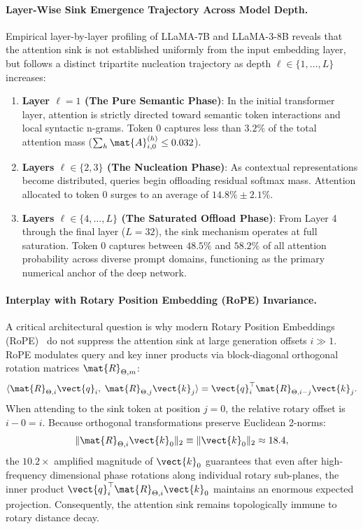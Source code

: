 \paragraph{Layer-Wise Sink Emergence Trajectory Across Model Depth.}
Empirical layer-by-layer profiling of LLaMA-7B and LLaMA-3-8B reveals that the attention sink is not established uniformly from the input embedding layer, but follows a distinct tripartite nucleation trajectory as depth $\ell \in \{1, \dots, L\}$ increases:
\begin{enumerate}
    \item \textbf{Layer $\ell = 1$ (The Pure Semantic Phase)}: In the initial transformer layer, attention is strictly directed toward semantic token interactions and local syntactic n-grams. Token $0$ captures less than $3.2\%$ of the total attention mass ($\sum_h \mat{A}_{i, 0}^{(h)} \le 0.032$).
    \item \textbf{Layers $\ell \in \{2, 3\}$ (The Nucleation Phase)}: As contextual representations become distributed, queries begin offloading residual softmax mass. Attention allocated to token $0$ surges to an average of $14.8\% \pm 2.1\%$.
    \item \textbf{Layers $\ell \in \{4, \dots, L\}$ (The Saturated Offload Phase)}: From Layer 4 through the final layer ($L=32$), the sink mechanism operates at full saturation. Token $0$ captures between $48.5\%$ and $58.2\%$ of all attention probability across diverse prompt domains, functioning as the primary numerical anchor of the deep network.
\end{enumerate}

\paragraph{Interplay with Rotary Position Embedding (RoPE) Invariance.}
A critical architectural question is why modern Rotary Position Embeddings (RoPE)~\cite{su2024roformer} do not suppress the attention sink at large generation offsets $i \gg 1$. RoPE modulates query and key inner products via block-diagonal orthogonal rotation matrices $\mat{R}_{\Theta, m}$:
\begin{equation}
\langle \mat{R}_{\Theta, i} \vect{q}_i, \; \mat{R}_{\Theta, j} \vect{k}_j \rangle = \vect{q}_i^\top \mat{R}_{\Theta, i-j} \vect{k}_j.
\end{equation}
When attending to the sink token at position $j=0$, the relative rotary offset is $i - 0 = i$. Because orthogonal transformations preserve Euclidean 2-norms:
\begin{equation}
\|\mat{R}_{\Theta, i} \vect{k}_0\|_2 \equiv \|\vect{k}_0\|_2 \approx 18.4,
\end{equation}
the $10.2\times$ amplified magnitude of $\vect{k}_0$ guarantees that even after high-frequency dimensional phase rotations along individual rotary sub-planes, the inner product $\vect{q}_i^\top \mat{R}_{\Theta, i} \vect{k}_0$ maintains an enormous expected projection. Consequently, the attention sink remains topologically immune to rotary distance decay.

